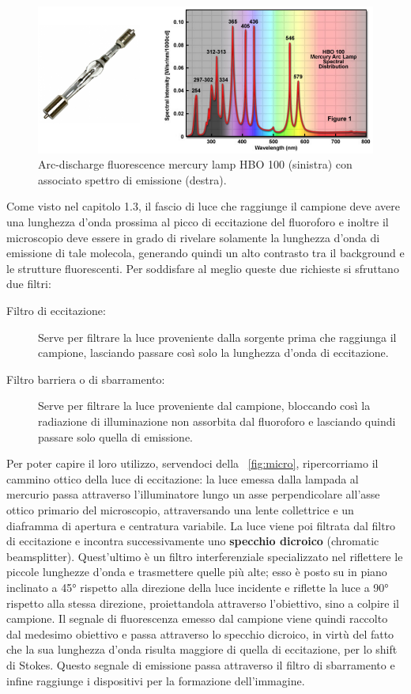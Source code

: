 \begin{figure}
 \centering
 \includegraphics[scale=.48]{img/CAP2lampadaquarzo.png}
 \caption{\small{Arc-discharge fluorescence mercury lamp HBO 100 (sinistra) con associato spettro di emissione (destra).}}
 \label{fig:lamp}
\end{figure}

Come visto nel capitolo 1.3, il fascio di luce che raggiunge il campione deve avere una lunghezza d'onda prossima al picco di eccitazione del fluoroforo e inoltre il microscopio deve essere in grado di rivelare solamente la lunghezza d'onda di emissione di tale molecola, generando quindi un alto contrasto tra il background e le strutture fluorescenti.
Per soddisfare al meglio queste due richieste si sfruttano due filtri:
\begin{description}
\item[Filtro di eccitazione:]
Serve per filtrare la luce proveniente dalla sorgente prima che raggiunga il campione, lasciando passare così solo la lunghezza d'onda di eccitazione.
\item[Filtro barriera o di sbarramento:]
Serve per filtrare la luce proveniente dal campione, bloccando così la radiazione di illuminazione non assorbita dal fluoroforo e lasciando quindi passare solo quella di emissione. 
\end{description}
Per poter capire il loro utilizzo, servendoci della \figurename~\ref{fig:micro}, ripercorriamo il cammino ottico della luce di eccitazione: la luce emessa dalla lampada al mercurio passa attraverso l'illuminatore lungo un asse perpendicolare all'asse ottico primario del microscopio, attraversando una lente collettrice e un diaframma di apertura e centratura variabile. 
La luce viene poi filtrata dal filtro di eccitazione e incontra successivamente uno \textbf{specchio dicroico} (chromatic beamsplitter). 
Quest'ultimo è un filtro interferenziale specializzato nel riflettere le piccole lunghezze d'onda e trasmettere quelle più alte; esso è posto su in piano inclinato a 45° rispetto alla direzione della luce incidente e riflette la luce a 90° rispetto alla stessa direzione, proiettandola attraverso l'obiettivo, sino a colpire il campione. 
Il segnale di fluorescenza emesso dal campione viene quindi raccolto dal medesimo obiettivo e passa attraverso lo specchio dicroico, in virtù del fatto che la sua lunghezza d'onda risulta maggiore di quella di eccitazione, per lo shift di Stokes. 
Questo segnale di emissione passa attraverso il filtro di sbarramento e infine raggiunge i dispositivi per la formazione dell'immagine.


